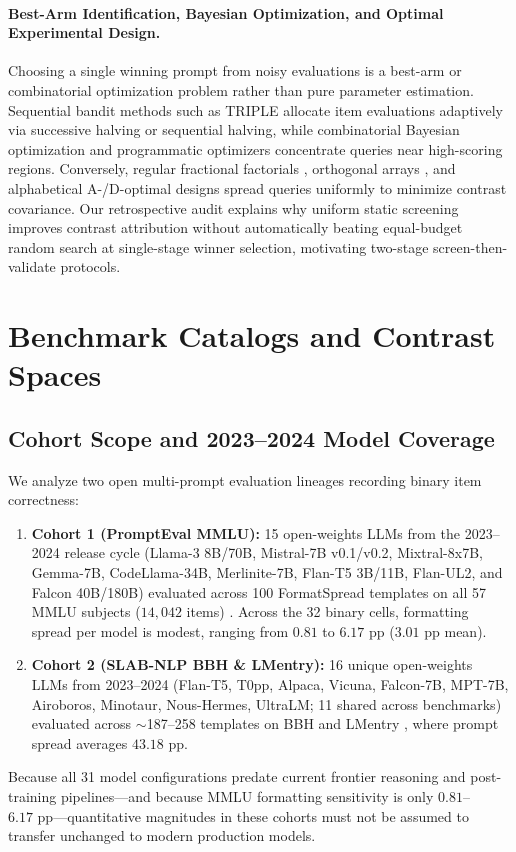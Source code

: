 \documentclass[11pt,a4paper]{article}
\begin{document}
\paragraph{Best-Arm Identification, Bayesian Optimization, and Optimal Experimental Design.}
Choosing a single winning prompt from noisy evaluations is a best-arm or combinatorial optimization problem rather than pure parameter estimation. Sequential bandit methods such as TRIPLE \citep{shi2024efficient} allocate item evaluations adaptively via successive halving or sequential halving, while combinatorial Bayesian optimization \citep{snoek2012practical,baptista2018bayesian} and programmatic optimizers \citep{khattab2024dspy,opsahl2024optimizing} concentrate queries near high-scoring regions. Conversely, regular fractional factorials \citep{plackett1946design,box2005statistics,wu2011experiments}, orthogonal arrays \citep{hedayat1999orthogonal}, and alphabetical A-/D-optimal designs \citep{fedorov1972theory,atkinson2007optimum} spread queries uniformly to minimize contrast covariance. Our retrospective audit explains why uniform static screening improves contrast attribution without automatically beating equal-budget random search at single-stage winner selection, motivating two-stage screen-then-validate protocols.

\section{Benchmark Catalogs and Contrast Spaces}

\subsection{Cohort Scope and 2023--2024 Model Coverage}
We analyze two open multi-prompt evaluation lineages recording binary item correctness:
\begin{enumerate}[leftmargin=*,nosep]
    \item \textbf{Cohort 1 (PromptEval MMLU):} 15 open-weights LLMs from the 2023--2024 release cycle (Llama-3 8B/70B, Mistral-7B v0.1/v0.2, Mixtral-8x7B, Gemma-7B, CodeLlama-34B, Merlinite-7B, Flan-T5 3B/11B, Flan-UL2, and Falcon 40B/180B) evaluated across 100 FormatSpread templates on all 57 MMLU subjects ($14{,}042$ items) \citep{polo2024efficient,hendrycks2021measuring}. Across the 32 binary cells, formatting spread per model is modest, ranging from $0.81$ to $6.17\text{ pp}$ ($3.01\text{ pp}$ mean).
    \item \textbf{Cohort 2 (SLAB-NLP BBH \& LMentry):} 16 unique open-weights LLMs from 2023--2024 (Flan-T5, T0pp, Alpaca, Vicuna, Falcon-7B, MPT-7B, Airoboros, Minotaur, Nous-Hermes, UltraLM; 11 shared across benchmarks) evaluated across $\sim$187--258 templates on BBH and LMentry \citep{mizrahi2024state,suzgun2023challenging,efrat2023lmentry}, where prompt spread averages $43.18\text{ pp}$.
\end{enumerate}
Because all 31 model configurations predate current frontier reasoning and post-training pipelines—and because MMLU formatting sensitivity is only $0.81$--$6.17\text{ pp}$—quantitative magnitudes in these cohorts must not be assumed to transfer unchanged to modern production models.
\end{document}
